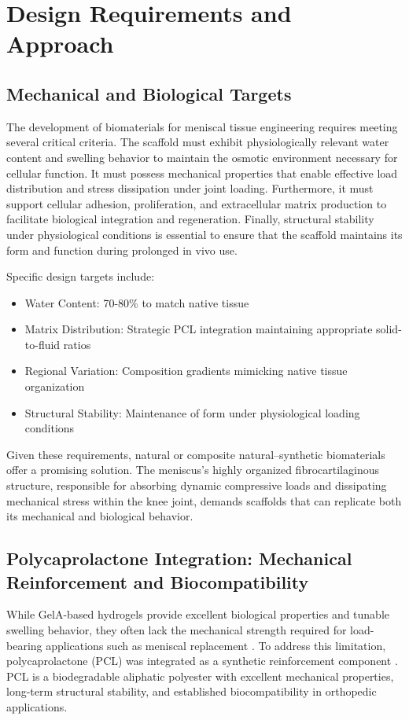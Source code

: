 \section{Design Requirements and Approach}
\subsection{Mechanical and Biological Targets}
The development of biomaterials for meniscal tissue engineering requires meeting several critical criteria. The scaffold must exhibit physiologically relevant water content and swelling behavior to maintain the osmotic environment necessary for cellular function. It must possess mechanical properties that enable effective load distribution and stress dissipation under joint loading. Furthermore, it must support cellular adhesion, proliferation, and extracellular matrix production to facilitate biological integration and regeneration. Finally, structural stability under physiological conditions is essential to ensure that the scaffold maintains its form and function during prolonged in vivo use.

Specific design targets include:
\begin{itemize}
    \item Water Content: 70-80\% to match native tissue~\cite{morejon2020compressiveproperties}
    \item Matrix Distribution: Strategic PCL integration maintaining appropriate solid-to-fluid ratios
    \item Regional Variation: Composition gradients mimicking native tissue organization
    \item Structural Stability: Maintenance of form under physiological loading conditions
\end{itemize}

Given these requirements, natural or composite natural–synthetic biomaterials offer a promising solution. The meniscus's highly organized fibrocartilaginous structure, responsible for absorbing dynamic compressive loads and dissipating mechanical stress within the knee joint, demands scaffolds that can replicate both its mechanical and biological behavior.

\subsection{Polycaprolactone Integration: Mechanical Reinforcement and Biocompatibility}

While GelA-based hydrogels provide excellent biological properties and tunable swelling behavior, they often lack the mechanical strength required for load-bearing applications such as meniscal replacement \cite{2021synthesisapplication}. To address this limitation, polycaprolactone (PCL) was integrated as a synthetic reinforcement component \cite{bagherisaed2020functionalizedpoly}. PCL is a biodegradable aliphatic polyester with excellent mechanical properties, long-term structural stability, and established biocompatibility in orthopedic applications.


